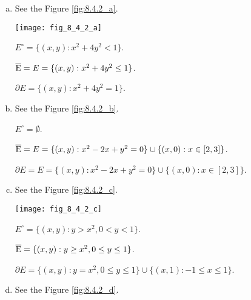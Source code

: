 \begin{Exercise}
\begin{enumerate}[a)]
\item
\begin{sketch} 
See the Figure \ref{fig:8.4.2_a}.

\begin{minipage}[h]{0.9\textwidth}
\centering
\texttt{[image: fig\_8\_4\_2\_a]}
\label{fig:8.4.2_a}
\end{minipage}

$E^\circ = \{(x,y):x^2+4y^2< 1\}$.

$\overline{\rm E} = E = \{(x,y):x^2+4y^2 \leq 1\}$.

$\partial E = \{(x,y):x^2+4y^2 = 1\}$.
\end{sketch}

\item
\begin{sketch} 
See the Figure \ref{fig:8.4.2_b}.

\begin{minipage}[h]{0.9\textwidth}
\centering

\label{fig:8.4.2_b}
\end{minipage}

$E^\circ = \emptyset$.

$\overline{\rm E} = E = \{(x,y):x^2-2x+y^2=0\}\cup\{(x,0):x\in[2,3]\}$.

$\partial E = E = \{(x,y):x^2-2x+y^2=0\}\cup\{(x,0):x\in[2,3]\}$.
\end{sketch}

\item
\begin{sketch} 
See the Figure \ref{fig:8.4.2_c}.

\begin{minipage}[h]{0.9\textwidth}
\centering
\texttt{[image: fig\_8\_4\_2\_c]}
\label{fig:8.4.2_c}
\end{minipage}

$E^\circ = \{(x,y):y>x^2,0<y<1\}$.

$\overline{\rm E} = \{(x,y):y\geq x^2, 0\leq y \leq 1\}$.

$\partial E = \{(x,y):y=x^2,0\leq y \leq 1\}\cup\{(x,1):-1\leq x\leq 1\}$.
\end{sketch}

\item
\begin{sketch} 
See the Figure \ref{fig:8.4.2_d}.


\end{sketch}
\end{enumerate}
\end{Exercise}
